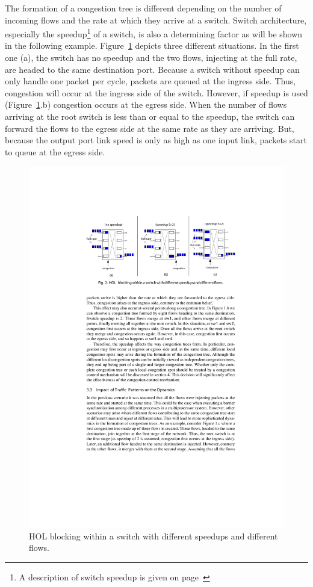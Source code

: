 The formation of a congestion tree is different depending on the number of incoming flows and the rate at which they arrive at a switch. Switch architecture, especially the speedup\footnote{A description of switch speedup is given on page~\pageref{desc:switch_speedup}} of a switch, is also a determining factor as will be shown in the following example. Figure~\ref{fig:speedup_effect} depicts three different situations. In the first one (a), the switch has no speedup and the two flows, injecting at the full rate, are headed to the same destination port. Because a switch without speedup can only handle one packet per cycle, packets are queued at the ingress side. Thus, congestion will occur at the ingress side of the switch. However, if speedup is used (Figure~\ref{fig:speedup_effect}.b) congestion occurs at the egress side. When the number of flows arriving at the root switch is less than or equal to the speedup, the switch can forward the flows to the egress side at the same rate as they are arriving. But, because the output port link speed is only as high as one input link, packets start to queue at the egress side. 

\begin{figure}[ht]
	\centering
		\includegraphics{figures/speedup_effect.pdf}
		\caption{HOL blocking within a switch with different speedups and different flows.}
		\label{fig:speedup_effect}
\end{figure}

